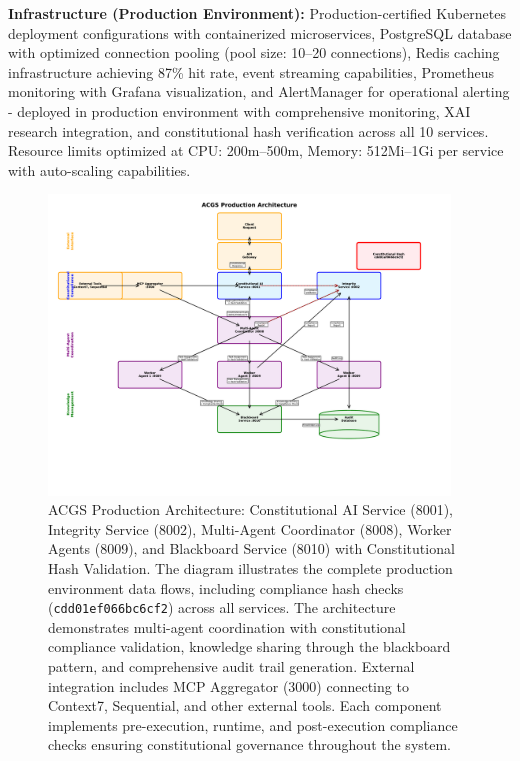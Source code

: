 \documentclass[manuscript,screen,9pt]{acmart}
\begin{document}
\textbf{Infrastructure (Production Environment):}
Production-certified Kubernetes deployment configurations with containerized microservices, PostgreSQL database with optimized connection pooling (pool size: 10--20 connections), Redis caching infrastructure achieving 87\% hit rate, event streaming capabilities, Prometheus monitoring with Grafana visualization, and AlertManager for operational alerting - deployed in production environment with comprehensive monitoring, XAI research integration, and constitutional hash verification across all 10 services. Resource limits optimized at CPU: 200m--500m, Memory: 512Mi--1Gi per service with auto-scaling capabilities.
\begin{figure}[!htb]
\centering
\includegraphics[width=0.95\textwidth,keepaspectratio]{figures/production_architecture.pdf}
\caption[ACGS Production Architecture]{ACGS Production Architecture: Constitutional AI Service (8001), Integrity Service (8002), Multi-Agent Coordinator (8008), Worker Agents (8009), and Blackboard Service (8010) with Constitutional Hash Validation. The diagram illustrates the complete production environment data flows, including compliance hash checks (\texttt{\small{cdd01ef066bc6cf2}}) across all services. The architecture demonstrates multi-agent coordination with constitutional compliance validation, knowledge sharing through the blackboard pattern, and comprehensive audit trail generation. External integration includes MCP Aggregator (3000) connecting to Context7, Sequential, and other external tools. Each component implements pre-execution, runtime, and post-execution compliance checks ensuring constitutional governance throughout the system.}
\label{fig:architecture}
\end{figure}
\end{document}

